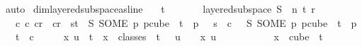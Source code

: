 \begin{isabellebody}
\ auto\isanewline
{}\isamarkupfalse%
%
\endisatagproof
{\isafoldproof}%
%
\isadelimproof
\isanewline
%
\endisadelimproof
\isanewline
{}\isamarkupfalse%
\ dim{}{\isacharunderscore}{\kern0pt}layered{\isacharunderscore}{\kern0pt}subspace{\isacharunderscore}{\kern0pt}as{\isacharunderscore}{\kern0pt}line{\isacharcolon}{\kern0pt}\isanewline
\ \ \ {\isachardoublequoteopen}t\ {\isachargreater}{\kern0pt}\ {}{\isachardoublequoteclose}\isanewline
\ \ \ \ \ {\isachardoublequoteopen}layered{\isacharunderscore}{\kern0pt}subspace\ S\ {}\ n\ t\ r\ {\isasymchi}{\isachardoublequoteclose}\isanewline
\ \ \ {\isachardoublequoteopen}{\isasymexists}c{}\ c{}{\isachardot}{\kern0pt}\ c{}{\isacharless}{\kern0pt}r\ {\isasymand}\ c{}{\isacharless}{\kern0pt}r\ {\isasymand}\ {\isacharparenleft}{\kern0pt}{\isasymforall}s{\isacharless}{\kern0pt}t{\isachardot}{\kern0pt}\ {\isasymchi}\ {\isacharparenleft}{\kern0pt}S\ {\isacharparenleft}{\kern0pt}SOME\ p{\isachardot}{\kern0pt}\ p{\isasymin}cube\ {}\ {\isacharparenleft}{\kern0pt}t{\isacharplus}{\kern0pt}{}{\isacharparenright}{\kern0pt}\ {\isasymand}\ p\ {}\ {\isacharequal}{\kern0pt}\ s{\isacharparenright}{\kern0pt}{\isacharparenright}{\kern0pt}\ {\isacharequal}{\kern0pt}\ c{}{\isacharparenright}{\kern0pt}\ {\isasymand}\ {\isasymchi}\ {\isacharparenleft}{\kern0pt}S\ {\isacharparenleft}{\kern0pt}SOME\ p{\isachardot}{\kern0pt}\ p{\isasymin}cube\ {}\ {\isacharparenleft}{\kern0pt}t{\isacharplus}{\kern0pt}{}{\isacharparenright}{\kern0pt}\ {\isasymand}\ p\ {}\ {\isacharequal}{\kern0pt}\ t{\isacharparenright}{\kern0pt}{\isacharparenright}{\kern0pt}\ {\isacharequal}{\kern0pt}\ c{}{\isachardoublequoteclose}\isanewline
%
\isadelimproof
%
\endisadelimproof
%
\isatagproof
{}\isamarkupfalse%
\ {\isacharminus}{\kern0pt}\isanewline
\ \ \isamarkupfalse%
\ {\isachardoublequoteopen}x\ u\ {\isacharless}{\kern0pt}\ t{\isachardoublequoteclose}\ \ {\isachardoublequoteopen}x\ {\isasymin}\ classes\ {}\ t\ {}{\isachardoublequoteclose}\ \ {\isachardoublequoteopen}u\ {\isacharless}{\kern0pt}\ {}{\isachardoublequoteclose}\ \ x\ u\ \isanewline
\ \ \isamarkupfalse%
\ {\isacharminus}{\kern0pt}\isanewline
\ \ \ \ \isamarkupfalse%
\ {\isachardoublequoteopen}x\ {\isasymin}\ cube\ {}\ {\isacharparenleft}{\kern0pt}t{\isacharplus}{\kern0pt}{}{\isacharparenright}{\kern0pt}{\isachardoublequoteclose}\ \isamarkupfalse%

\end{isabellebody}
